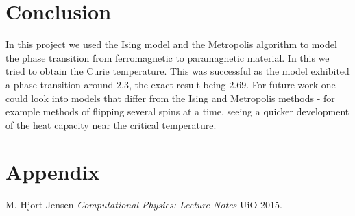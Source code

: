 \documentclass[norsk, 10pt, twocolumn, a4paper]{revtex4}
\begin{document}
\section{Conclusion}
In this project we used the Ising model and the Metropolis algorithm to model the phase transition
from ferromagnetic to paramagnetic material. In this we tried to obtain the Curie temperature.
This was successful as the model exhibited a phase transition around $2.3$, the exact result
being $2.69$. For future work one could look into models that differ from the Ising and Metropolis methods
- for example methods of flipping several spins at a time, seeing a quicker development of the heat
capacity near the critical temperature.


\section{Appendix}


\begin{thebibliography}{1}
 M. Hjort-Jensen {\em Computational Physics: Lecture Notes}  UiO 2015.

\end{thebibliography}
\end{document}
